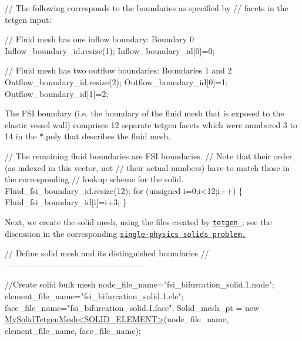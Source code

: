 \begin{DoxyCodeInclude}
 

 \textcolor{comment}{// The following corresponds to the boundaries as specified by}
 \textcolor{comment}{// facets in the tetgen input:}

 \textcolor{comment}{// Fluid mesh has one inflow boundary: Boundary 0}
 Inflow\_boundary\_id.resize(1);
 Inflow\_boundary\_id[0]=0;
 
 \textcolor{comment}{// Fluid mesh has two outflow boundaries: Boundaries 1 and 2}
 Outflow\_boundary\_id.resize(2);
 Outflow\_boundary\_id[0]=1;
 Outflow\_boundary\_id[1]=2;

\end{DoxyCodeInclude}


The F\+SI boundary (i.\+e. the boundary of the fluid mesh that is exposed to the elastic vessel wall) comprises 12 separate tetgen facets which were numbered 3 to 14 in the {\ttfamily $\ast$.poly} that describes the fluid mesh.


\begin{DoxyCodeInclude}
 
 \textcolor{comment}{// The remaining fluid boundaries are FSI boundaries.}
 \textcolor{comment}{// Note that their order (as indexed in this vector, not}
 \textcolor{comment}{// their actual numbers) have to match those in the corresponding}
 \textcolor{comment}{// lookup scheme for the solid.}
 Fluid\_fsi\_boundary\_id.resize(12);
 \textcolor{keywordflow}{for} (\textcolor{keywordtype}{unsigned} i=0;i<12;i++)
  \{
   Fluid\_fsi\_boundary\_id[i]=i+3;
  \}

\end{DoxyCodeInclude}


Next, we create the solid mesh, using the files created by \href{http://wias-berlin.de/software/tetgen//}{\tt {\ttfamily tetgen} }; see the discussion in the corresponding \href{../../../solid/unstructured_three_d_solid/html/index.html#mesh}{\tt single-\/physics solids problem.}


\begin{DoxyCodeInclude}
 \textcolor{comment}{// Define solid mesh and its distinguished boundaries}
 \textcolor{comment}{//---------------------------------------------------}
 
 \textcolor{comment}{//Create solid bulk mesh}
 node\_file\_name=\textcolor{stringliteral}{"fsi\_bifurcation\_solid.1.node"};
 element\_file\_name=\textcolor{stringliteral}{"fsi\_bifurcation\_solid.1.ele"};
 face\_file\_name=\textcolor{stringliteral}{"fsi\_bifurcation\_solid.1.face"};
 Solid\_mesh\_pt =  \textcolor{keyword}{new} \hyperlink{classMySolidTetgenMesh}{MySolidTetgenMesh<SOLID\_ELEMENT>}(node\_file\_name,
                                                    element\_file\_name,
                                                    face\_file\_name);

\end{DoxyCodeInclude}


